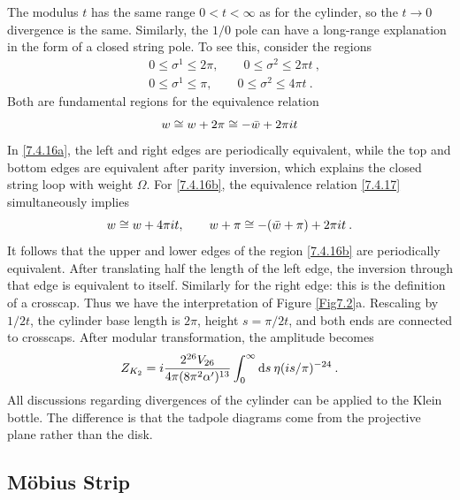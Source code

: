 The modulus $t$ has the same range $0<t<\infty$ as for the cylinder, so the $t \rightarrow 0$ divergence is the same. 
Similarly, the $1 / 0$ pole can have a long-range explanation in the form of a closed string pole. To see this, consider the regions 
\begin{subequations} \label{7.4.16}
	\begin{align}
		&0 \leq \sigma^{1} \leq 2 \pi, \qquad 0 \leq \sigma^{2} \leq 2 \pi t  \:, \label{7.4.16a} \\
		&0 \leq \sigma^{1} \leq \pi, \qquad 0 \leq \sigma^{2} \leq 4 \pi t \:. \label{7.4.16b} 
	\end{align}		
\end{subequations}
Both are fundamental regions for the equivalence relation 
\begin{equation}
	w \cong w+2 \pi \cong-\bar{w}+2 \pi i t \label{7.4.17} 
\end{equation}
In \eqref{7.4.16a}, the left and right edges are periodically equivalent, while the top and bottom edges are equivalent after parity inversion, which explains the closed string loop with weight $\Omega $. For \eqref{7.4.16b}, the equivalence relation \eqref{7.4.17} simultaneously implies 
\begin{equation}
	w \cong w+4 \pi i t, \qquad w+\pi \cong-(\bar{w}+\pi)+2 \pi i t \:. \label{7.4.18} 
\end{equation}
It follows that the upper and lower edges of the region \eqref{7.4.16b} are periodically equivalent. After translating half the length of the left edge, the inversion through that edge is equivalent to itself. Similarly for the right edge: this is the definition of a crosscap. Thus we have the interpretation of Figure \ref{Fig7.2}a. Rescaling by $1 / 2 t$, the cylinder base length is $2 \pi$, height $s=\pi / 2 t$, and both ends are connected to crosscaps. 
After modular transformation, the amplitude becomes 
\begin{equation}
	Z_{K_{2}}=i \frac{2^{26} V_{26}}{4 \pi(8 \pi^{2} \alpha^{\prime})^{13}} \int_{0}^{\infty} \mathrm{d} s\: \eta(i s / \pi)^{-24} \:. \label{7.4.19} 
\end{equation}
All discussions regarding divergences of the cylinder can be applied to the Klein bottle. The difference is that the tadpole diagrams come from the projective plane rather than the disk. 

\subsection*{M\"{o}bius Strip} 

